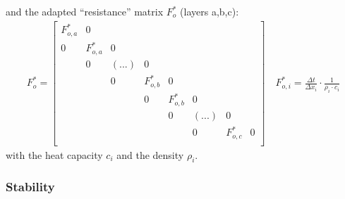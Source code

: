 \documentclass[letterpaper,10pt,english]{jupyterBook}
\begin{document}
\sphinxAtStartPar
and the adapted “resistance” matrix \(F_{o}^*\) (layers a,b,c):
\begin{equation*}
\begin{split} F_{o}^* = \left [ 
\begin{array}{ccccccc}
    F_{o,a}^* & 0\\
    0 & F_{o,a}^*  & 0\\ 
     &  0 &  (...)  & 0\\
      &   &  0 & F_{o,b}^* & 0\\
      &   &    & 0 & F_{o,b}^* & 0\\
      &   &   &    & 0  &  (...) & 0\\
      &   &   &   &    & 0 &  F_{o,c}^* & 0\\
\end{array}
\right]  \quad F_{o,i}^* = \frac{\Delta t}{\Delta x_i} \cdot \frac{1}{\rho_i \cdot c_i}\end{split}
\end{equation*}
\sphinxAtStartPar
with the heat capacity \(c_i\) and the density \(\rho_i\).


\subsubsection{Stability}
\label{\detokenize{Aufgabe1:stability}}
\end{document}

